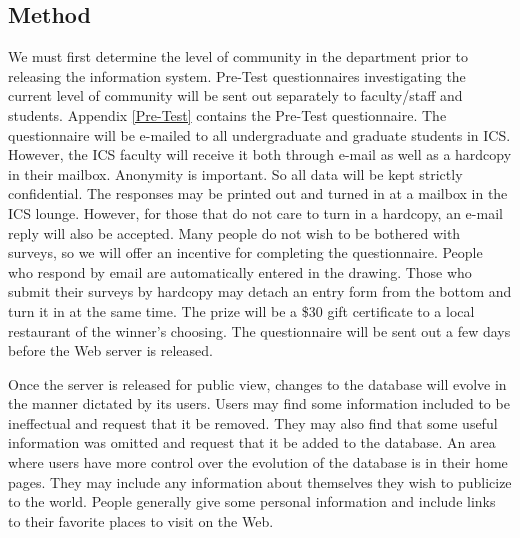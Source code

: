 \subsection{Method}



We must first determine the level of community in the department prior to
releasing the information system.  Pre-Test questionnaires investigating
the current level of community will be sent out separately to faculty/staff
and students.  Appendix \ref{Pre-Test} contains the Pre-Test questionnaire.
The questionnaire will be e-mailed to all undergraduate and graduate
students in ICS.  However, the ICS faculty will receive it both through
e-mail as well as a hardcopy in their mailbox.  Anonymity is important.  So
all data will be kept strictly confidential.  The responses may be printed
out and turned in at a mailbox in the ICS lounge.  However, for those that
do not care to turn in a hardcopy, an e-mail reply will also be accepted.
Many people do not wish to be bothered with surveys, so we will offer an
incentive for completing the questionnaire.  People who respond by email
are automatically entered in the drawing.  Those who submit their surveys
by hardcopy may detach an entry form from the bottom and turn it in at the
same time.  The prize will be a \$30 gift certificate to a local restaurant
of the winner's choosing.  The questionnaire will be sent out a few days
before the Web server is released.

Once the server is released for public view, changes to the database will
evolve in the manner dictated by its users.  Users may find some information
included to be ineffectual and request that it be removed.  They may also find
that some useful information was omitted and request that it be added to the
database.  An area where users have more control over the evolution of the
database is in their home pages.  They may include any information about
themselves they wish to publicize to the world.  People generally give some
personal information and include links to their favorite places to visit on the
Web.

